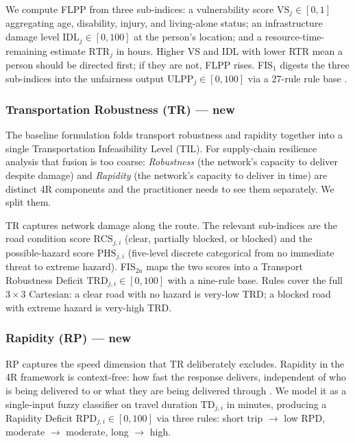 \documentclass[applsci,article,submit,moreauthors,pdftex]{Definitions/mdpi}
\begin{document}
We compute FLPP from three sub-indices: a vulnerability score $\mathrm{VS}_j \in
[0,1]$ aggregating age, disability, injury, and living-alone status; an
infrastructure damage level $\mathrm{IDL}_j \in [0,100]$ at the person's
location; and a resource-time-remaining estimate $\mathrm{RTR}_j$ in hours.
Higher VS and IDL with lower RTR mean a person should be directed first; if
they are not, FLPP rises. FIS$_1$ digests the three sub-indices into the
unfairness output $\mathrm{ULPP}_j \in [0,100]$ via a 27-rule rule base
\cite{mamdani1975}.

\subsubsection{Transportation Robustness (TR) — new}

The baseline formulation folds transport robustness and rapidity together into a
single Transportation Infeasibility Level (TIL). For supply-chain resilience
analysis that fusion is too coarse: \emph{Robustness} (the network's capacity
to deliver despite damage) and \emph{Rapidity} (the network's capacity to
deliver in time) are distinct 4R components and the practitioner needs to see
them separately. We split them.

TR captures network damage along the route. The relevant sub-indices are the
road condition score $\mathrm{RCS}_{j,i}$ (clear, partially blocked, or
blocked) and the possible-hazard score $\mathrm{PHS}_{j,i}$ (five-level
discrete categorical from no immediate threat to extreme hazard). FIS$_{2a}$
maps the two scores into a Transport Robustness Deficit
$\mathrm{TRD}_{j,i} \in [0,100]$ with a nine-rule base. Rules cover the full
$3 \times 3$ Cartesian: a clear road with no hazard is very-low TRD; a
blocked road with extreme hazard is very-high TRD.

\subsubsection{Rapidity (RP) — new}

RP captures the speed dimension that TR deliberately excludes. Rapidity in
the 4R framework is context-free: how fast the response delivers, independent
of who is being delivered to or what they are being delivered through
\cite{bruneau2003}. We model it as a single-input fuzzy classifier on travel
duration $\mathrm{TD}_{j,i}$ in minutes, producing a Rapidity Deficit
$\mathrm{RPD}_{j,i} \in [0,100]$ via three rules: short trip $\to$ low RPD,
moderate $\to$ moderate, long $\to$ high.
\end{document}
